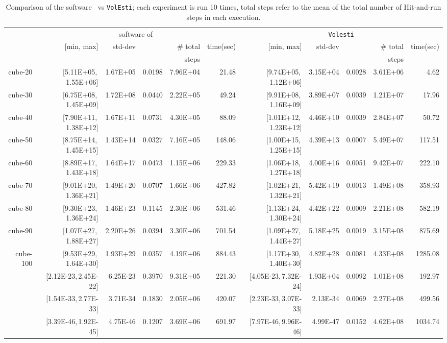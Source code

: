 \documentclass[11pt,a4paper]{article}
\begin{document}
\begin{table}[t!]\centering\tiny
\begin{tabular*}{\linewidth}{@{\extracolsep{\fill}}r@{\,}|@{\,}r@{\,}
r@{\,}r@{\,}r@{\,}r@{\,}|@{\,}r@{\,}r@{\,}r@{\,}r@{\,}r}
& \multicolumn{5}{c}{software of~\cite{CousinsV13}} & \multicolumn{5}{c}{{\tt Volesti}}\\
   & [min, max]  & std-dev & {\tiny \multirow{2}{*}{}} & \# total & time(sec)
  & [min, max]  & std-dev & \multirow{2}{*}{} & \# total & time(sec)\\
 &&&&steps&&&&&steps& \\\hline
cube-20  & [5.11E+05,\,1.55E+06] & 1.67E+05 & 0.0198 & 7.96E+04 & 21.48 & [9.74E+05,\,1.12E+06] & 3.15E+04 & 0.0028 & 3.61E+06 &  4.62\\
cube-30  & [6.75E+08,\,1.45E+09] & 1.72E+08 & 0.0440 & 2.22E+05 &  49.24 & [9.91E+08,\,1.16E+09] & 3.89E+07 & 0.0039 & 1.21E+07 &  17.96\\
cube-40  & [7.90E+11,\,1.38E+12] & 1.67E+11 & 0.0731 & 4.30E+05 &  88.09 & [1.01E+12,\,1.23E+12] & 4.46E+10 & 0.0039 & 2.84E+07 &  50.72\\
cube-50  & [8.75E+14,\,1.45E+15] & 1.43E+14 & 0.0327 & 7.16E+05 &  148.06 & [1.00E+15,\,1.25E+15] & 4.39E+13 & 0.0007 & 5.49E+07 &  117.51\\
cube-60  & [8.89E+17,\,1.43E+18] & 1.64E+17 & 0.0473 & 1.15E+06 &  229.33 & [1.06E+18,\,1.27E+18] & 4.00E+16 & 0.0051 & 9.42E+07 &  222.10\\
cube-70  & [9.01E+20,\,1.36E+21] & 1.49E+20 & 0.0707 & 1.66E+06 &  427.82 & [1.02E+21,\,1.32E+21] & 5.42E+19 & 0.0013 & 1.49E+08 &  358.93\\
cube-80  & [9.30E+23,\,1.36E+24] & 1.46E+23 & 0.1145 & 2.30E+06 &  531.46 & [1.13E+24,\,1.30E+24] & 4.42E+22 & 0.0009 & 2.21E+08 &  582.19\\
cube-90  & [1.07E+27,\,1.88E+27] & 2.20E+26 & 0.0394 & 3.30E+06 &  701.54 & [1.09E+27,\,1.44E+27] & 5.18E+25 & 0.0019 & 3.15E+08 &  875.69\\
cube-100 & [9.53E+29,\,1.64E+30] & 1.93E+29 & 0.0357 & 4.19E+06 &  884.43 & [1.17E+30,\,1.40E+30] & 4.82E+28 & 0.0081 & 4.33E+08 &  1285.08\\
   & [2.12E-23,\,2.45E-22] & 6.25E-23 & 0.3970 & 9.31E+05 &  221.30 & [4.05E-23,\,7.32E-24] & 1.93E+04 & 0.0092 & 1.01E+08 & 192.97\\
   & [1.54E-33,\,2.77E-33] & 3.71E-34 & 0.1830 & 2.05E+06 &  420.07 & [2.23E-33,\,3.07E-33] & 2.13E-34 & 0.0069 & 2.27E+08 & 499.56\\
  & [3.39E-46,\,1.92E-45] & 4.75E-46 & 0.1207 & 3.69E+06 &  691.97 & [7.97E-46,\,9.96E-46] & 4.99E-47 & 0.0152 & 4.62E+08 & 1034.74\\
\end{tabular*} 
\caption{ Comparison of the software~\cite{CousinsV13} vs {\tt VolEsti}; each experiment is run 10 times, total steps refer to the mean of the total number of Hit-and-run steps in each execution.\label{table:matlab}}
\end{table} 
\end{document}
